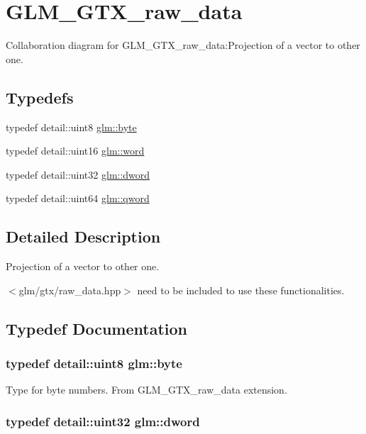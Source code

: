 \hypertarget{group__gtx__raw__data}{
\section{GLM\_\-GTX\_\-raw\_\-data}
\label{group__gtx__raw__data}
}


Collaboration diagram for GLM\_\-GTX\_\-raw\_\-data:Projection of a vector to other one.  
\subsection*{Typedefs}
\begin{CompactItemize}
\item 
typedef detail::uint8 \hyperlink{group__gtx__raw__data_gcd7fe1f2ad60a57f7d7ad4f1e6836efd}{glm::byte}
\item 
typedef detail::uint16 \hyperlink{group__gtx__raw__data_g5617a479d471021b5c773c5e969ba46d}{glm::word}
\item 
typedef detail::uint32 \hyperlink{group__gtx__raw__data_g1fc2589df6d44e923cd1820cf14805cf}{glm::dword}
\item 
typedef detail::uint64 \hyperlink{group__gtx__raw__data_g32447af289e879589883c9b7e3be1246}{glm::qword}
\end{CompactItemize}


\subsection{Detailed Description}
Projection of a vector to other one. 

$<$glm/gtx/raw\_\-data.hpp$>$ need to be included to use these functionalities. 

\subsection{Typedef Documentation}
\hypertarget{group__gtx__raw__data_gcd7fe1f2ad60a57f7d7ad4f1e6836efd}{
\subsubsection[byte]{\setlength{\rightskip}{0pt plus 5cm}typedef detail::uint8 {\bf glm::byte}}}
\label{group__gtx__raw__data_gcd7fe1f2ad60a57f7d7ad4f1e6836efd}


Type for byte numbers. From GLM\_\-GTX\_\-raw\_\-data extension. \hypertarget{group__gtx__raw__data_g1fc2589df6d44e923cd1820cf14805cf}{
\subsubsection[dword]{\setlength{\rightskip}{0pt plus 5cm}typedef detail::uint32 {\bf glm::dword}}}
\label{group__gtx__raw__data_g1fc2589df6d44e923cd1820cf14805cf}


